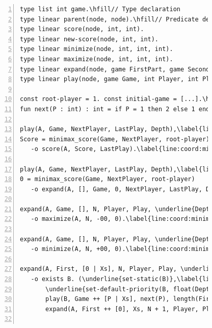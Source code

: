 \begin{figure}[ht]
\begin{Verbatim}[numbers=left,commandchars=\\\{\},fontsize=\scriptsize]
type list int game.\hfill// Type declaration
type linear parent(node, node).\hfill// Predicate declaration
type linear score(node, int, int).
type linear new-score(node, int, int).
type linear minimize(node, int, int, int).
type linear maximize(node, int, int, int).
type linear expand(node, game FirstPart, game SecondPart, int Descendants, int Player, int Play, int Depth).
type linear play(node, game Game, int Player, int Play, int Depth).

const root-player = 1. const initial-game = [...].\hfill// Constant declaration: player and initial game state
fun next(P : int) : int = if P = 1 then 2 else 1 end.\hfill// Function declaration: select next player

play(A, Game, NextPlayer, LastPlay, Depth),\label{line:coord:minimax_play1}\label{line:coord:minimax_play11}\hfill// Rule 1: ending game state
Score = minimax_score(Game, NextPlayer, root-player), Score > 0
   -o score(A, Score, LastPlay).\label{line:coord:minimax_play12}

play(A, Game, NextPlayer, LastPlay, Depth),\label{line:coord:minimax_play21}\hfill// Rule 2: expand state
0 = minimax_score(Game, NextPlayer, root-player)
   -o expand(A, [], Game, 0, NextPlayer, LastPlay, Depth).\label{line:coord:minimax_play2}\label{line:coord:minimax_play22}

expand(A, Game, [], N, Player, Play, \underline{Depth}), Player = root-player\label{line:coord:minimax_expand1}\label{line:coord:minimax_rule11}\hfill// Rule 3: maximize node
   -o maximize(A, N, -00, 0).\label{line:coord:minimax_rule12}

expand(A, Game, [], N, Player, Play, \underline{Depth}), Player <> root-player\label{line:coord:minimax_rule21}\hfill// Rule 4: minimize node
   -o minimize(A, N, +00, 0).\label{line:coord:minimax_rule22}

expand(A, First, [0 | Xs], N, Player, Play, \underline{Depth}), Depth >= 5\label{line:coord:minimax_rule31}\hfill// Rule 5: create static child node
   -o exists B. (\underline{set-static(B)},\label{line:coord:minimax_coord1}
       \underline{set-default-priority(B, float(Depth + 1))},\label{line:coord:minimax_coord2}
       play(B, Game ++ [P | Xs], next(P), length(First), \underline{Depth + 1}), parent(B, A).
       expand(A, First ++ [0], Xs, N + 1, Player, Play, \underline{Depth})).\label{line:coord:minimax_rule32}


\end{Verbatim}
\end{figure}
